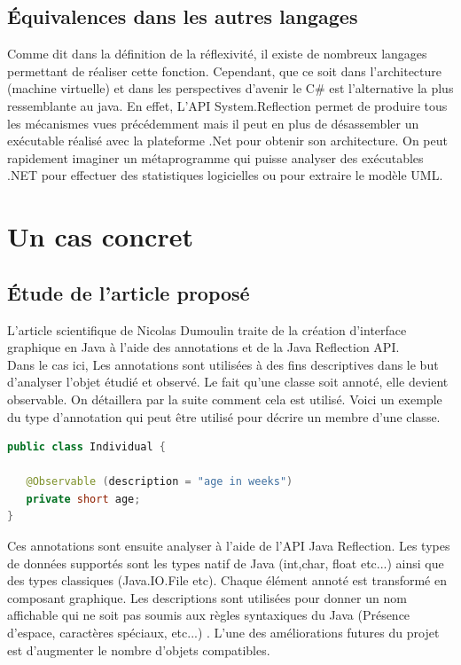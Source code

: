 \documentclass[a4paper,11pt]{report}
\begin{document}
{{{{\section{Équivalences dans les autres langages}

\normalsize{
Comme dit dans la définition de la réflexivité, il existe de nombreux langages permettant de réaliser cette fonction. Cependant, que ce soit dans l'architecture (machine virtuelle) et dans les perspectives d'avenir le C\# est l'alternative la plus ressemblante au java. En effet, L'API System.Reflection permet de produire tous les mécanismes vues précédemment mais il peut  en plus de désassembler un exécutable réalisé avec la plateforme .Net pour obtenir son architecture. On peut rapidement imaginer un métaprogramme qui puisse analyser des exécutables .NET pour effectuer des statistiques logicielles ou pour extraire le modèle UML. 
}

\chapter{Un cas concret}

\section{Étude de l'article proposé}

\normalsize{
L'article scientifique de Nicolas Dumoulin traite de la création d'interface graphique en Java à l'aide des annotations et de la Java Reflection API. \\

Dans le cas ici, Les annotations sont utilisées à des fins descriptives dans le but d'analyser l'objet étudié et observé. Le fait qu'une classe soit annoté, elle devient observable. On détaillera par la suite comment cela est utilisé.  Voici un exemple du type d'annotation qui peut être utilisé pour décrire un membre d'une classe.
}

\begin{lstlisting}[language=Java]
public class Individual {

   @Observable (description = "age in weeks")
   private short age;
}
\end{lstlisting}

\normalsize{
Ces annotations sont ensuite analyser à l'aide de l'API Java Reflection. Les types de données supportés sont les types natif de Java (int,char, float etc...) ainsi que des types classiques (Java.IO.File etc). Chaque élément annoté est transformé en composant graphique. Les descriptions sont utilisées pour donner un nom affichable qui ne soit pas soumis aux règles syntaxiques du Java (Présence d'espace, caractères spéciaux, etc...) . L'une des améliorations futures du projet est d'augmenter le nombre d'objets compatibles.   
}

}}}}
\end{document}
